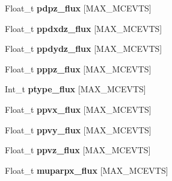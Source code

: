 \begin{DoxyCompactItemize}
\item 
\hypertarget{classanatree_a3a31898aaa1b8d4f26175171e868e847}{Float\-\_\-t {\bfseries pdpz\-\_\-flux} \mbox{[}M\-A\-X\-\_\-\-M\-C\-E\-V\-T\-S\mbox{]}}\label{classanatree_a3a31898aaa1b8d4f26175171e868e847}

\item 
\hypertarget{classanatree_a88d794d9dbfa5916519f6b4602842b0d}{Float\-\_\-t {\bfseries ppdxdz\-\_\-flux} \mbox{[}M\-A\-X\-\_\-\-M\-C\-E\-V\-T\-S\mbox{]}}\label{classanatree_a88d794d9dbfa5916519f6b4602842b0d}

\item 
\hypertarget{classanatree_afc3a10e2ff0baeff8ebaaa144b734073}{Float\-\_\-t {\bfseries ppdydz\-\_\-flux} \mbox{[}M\-A\-X\-\_\-\-M\-C\-E\-V\-T\-S\mbox{]}}\label{classanatree_afc3a10e2ff0baeff8ebaaa144b734073}

\item 
\hypertarget{classanatree_a41583953021fa587d86dab1ecb0372f3}{Float\-\_\-t {\bfseries pppz\-\_\-flux} \mbox{[}M\-A\-X\-\_\-\-M\-C\-E\-V\-T\-S\mbox{]}}\label{classanatree_a41583953021fa587d86dab1ecb0372f3}

\item 
\hypertarget{classanatree_a390d9cff04f0d42915a66d77eedd8ef9}{Int\-\_\-t {\bfseries ptype\-\_\-flux} \mbox{[}M\-A\-X\-\_\-\-M\-C\-E\-V\-T\-S\mbox{]}}\label{classanatree_a390d9cff04f0d42915a66d77eedd8ef9}

\item 
\hypertarget{classanatree_a0d1e56f4b47964ea40672516ba877671}{Float\-\_\-t {\bfseries ppvx\-\_\-flux} \mbox{[}M\-A\-X\-\_\-\-M\-C\-E\-V\-T\-S\mbox{]}}\label{classanatree_a0d1e56f4b47964ea40672516ba877671}

\item 
\hypertarget{classanatree_a3f12da41c30cfa5b0d5b2cd7a49f6879}{Float\-\_\-t {\bfseries ppvy\-\_\-flux} \mbox{[}M\-A\-X\-\_\-\-M\-C\-E\-V\-T\-S\mbox{]}}\label{classanatree_a3f12da41c30cfa5b0d5b2cd7a49f6879}

\item 
\hypertarget{classanatree_a79454ca2f63ac3ca7d5cf0861e88bf5c}{Float\-\_\-t {\bfseries ppvz\-\_\-flux} \mbox{[}M\-A\-X\-\_\-\-M\-C\-E\-V\-T\-S\mbox{]}}\label{classanatree_a79454ca2f63ac3ca7d5cf0861e88bf5c}

\item 
\hypertarget{classanatree_a58bce86554eb75d28171f22cddf74e62}{Float\-\_\-t {\bfseries muparpx\-\_\-flux} \mbox{[}M\-A\-X\-\_\-\-M\-C\-E\-V\-T\-S\mbox{]}}\label{classanatree_a58bce86554eb75d28171f22cddf74e62}


\end{DoxyCompactItemize}
